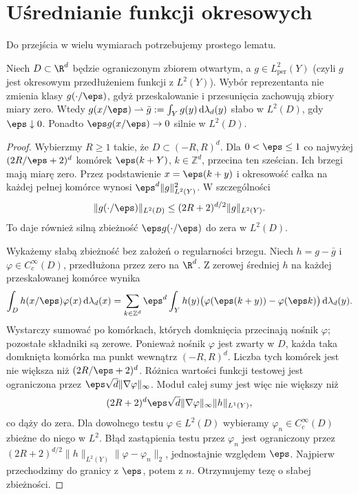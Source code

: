 \section{Uśrednianie funkcji okresowych}
Do przejścia w wielu wymiarach potrzebujemy prostego lematu.
\begin{lemat}\label{lem:pde30-average}
Niech $D\subset\R^d$ będzie ograniczonym zbiorem otwartym,
a $g\in L^2_{\mathrm{per}}(Y)$ (czyli $g$ jest okresowym
przedłużeniem funkcji z $L^2(Y)$). Wybór reprezentanta
nie zmienia klasy $g(\cdot/\eps)$, gdyż przeskalowanie
i przesunięcia zachowują zbiory miary zero. Wtedy
$g(x/\eps)\rightharpoonup\bar g:=\int_Yg(y)\,\mathrm d\lambda_d(y)$
słabo w $L^2(D)$, gdy $\eps\downarrow0$.
Ponadto $\eps g(x/\eps)\to0$ silnie w $L^2(D)$.
\end{lemat}
\begin{proof}
Wybierzmy $R\ge1$ takie, że $D\subset(-R,R)^d$.
Dla $0<\eps\le1$ co najwyżej $(2R/\eps+2)^d$
komórek $\eps(k+Y)$, $k\in\mathbb Z^d$, przecina
ten sześcian. Ich brzegi mają miarę zero.
Przez podstawienie $x=\eps(k+y)$ i okresowość
całka na każdej pełnej komórce wynosi
$\eps^d\|g\|_{L^2(Y)}^2$. W szczególności
\[
 \|g(\cdot/\eps)\|_{L^2(D)}
 \le (2R+2)^{d/2}\|g\|_{L^2(Y)}.
\]
To daje również silną zbieżność $\eps g(\cdot/\eps)$
do zera w $L^2(D)$.

Wykażemy słabą zbieżność bez założeń o regularności brzegu.
Niech $h=g-\bar g$ i $\varphi\in C_c^\infty(D)$,
przedłużona przez zero na $\R^d$. Z zerowej średniej
$h$ na każdej przeskalowanej komórce wynika
\[
 \begin{aligned}
 \int_D h(x/\eps)\varphi(x)\,\mathrm d\lambda_d(x)
 =\sum_{k\in\mathbb Z^d}\eps^d\int_Y h(y)
 \bigl(\varphi(\eps(k+y))-\varphi(\eps k)\bigr)
 \,\mathrm d\lambda_d(y).
 \end{aligned}
\]
Wystarczy sumować po komórkach, których domknięcia
przecinają nośnik $\varphi$; pozostałe składniki są zerowe.
Ponieważ nośnik $\varphi$ jest zwarty w $D$,
każda taka domknięta komórka ma punkt wewnątrz
$(-R,R)^d$. Liczba tych komórek jest nie większa
niż $(2R/\eps+2)^d$.
Różnica wartości funkcji testowej jest ograniczona
przez $\eps\sqrt d\|\nabla\varphi\|_\infty$.
Moduł całej sumy jest więc nie większy niż
\[
 (2R+2)^d\eps\sqrt d\|\nabla\varphi\|_\infty
 \|h\|_{L^1(Y)},
\]
co dąży do zera. Dla dowolnego testu $\varphi\in L^2(D)$
wybieramy $\varphi_n\in C_c^\infty(D)$ zbieżne
do niego w $L^2$. Błąd zastąpienia testu przez
$\varphi_n$ jest ograniczony przez
$(2R+2)^{d/2}\|h\|_{L^2(Y)}\|\varphi-\varphi_n\|_2$,
jednostajnie względem $\eps$. Najpierw przechodzimy
do granicy z $\eps$, potem z $n$.
Otrzymujemy tezę o słabej zbieżności.
\end{proof}

